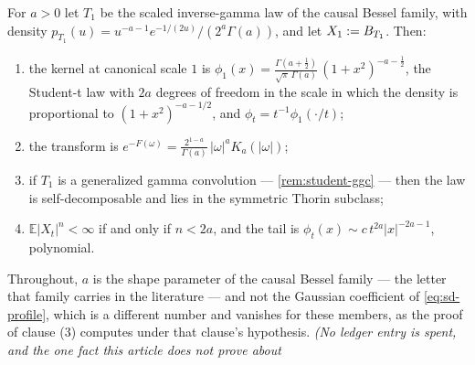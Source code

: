 \begin{proposition}\label{prop:student-t}
\notready
{}
For $a > 0$ let $T_1$ be the scaled inverse-gamma law of the causal Bessel family, with density
$p_{T_1}(u) = u^{-a-1}e^{-1/(2u)}/(2^a\Gamma(a))$, and let $X_1 := B_{T_1}$. Then:
\begin{enumerate}
\item the kernel at canonical scale $1$ is
$\phi_1(x) = \frac{\Gamma(a+\frac12)}{\sqrt\pi\,\Gamma(a)}\,(1+x^2)^{-a-\frac12}$, the
Student-t law with $2a$ degrees of freedom in the scale in which the density is proportional to
$(1+x^2)^{-a-1/2}$, and $\phi_t = t^{-1}\phi_1(\cdot/t)$;
\item the transform is
$e^{-F(\omega)} = \frac{2^{1-a}}{\Gamma(a)}\,|\omega|^aK_a(|\omega|)$;
\item if $T_1$ is a generalized gamma convolution --- \ref{rem:student-ggc} --- then the law is
self-decomposable and lies in the symmetric Thorin subclass;
\item $\mathbb{E}|X_t|^n < \infty$ if and only if $n < 2a$, and the tail is
$\phi_t(x) \sim c\,t^{2a}|x|^{-2a-1}$, polynomial.
\end{enumerate}
Throughout, $a$ is the shape parameter of the causal Bessel family --- the letter that family
carries in the literature --- and not the Gaussian coefficient of \ref{eq:sd-profile}, which is a
different number and vanishes for these members, as the proof of clause (3) computes under that
clause's hypothesis.
\statusT\quad\emph{(No ledger entry is spent, and the one fact this article does not prove about
}
\end{proposition}
